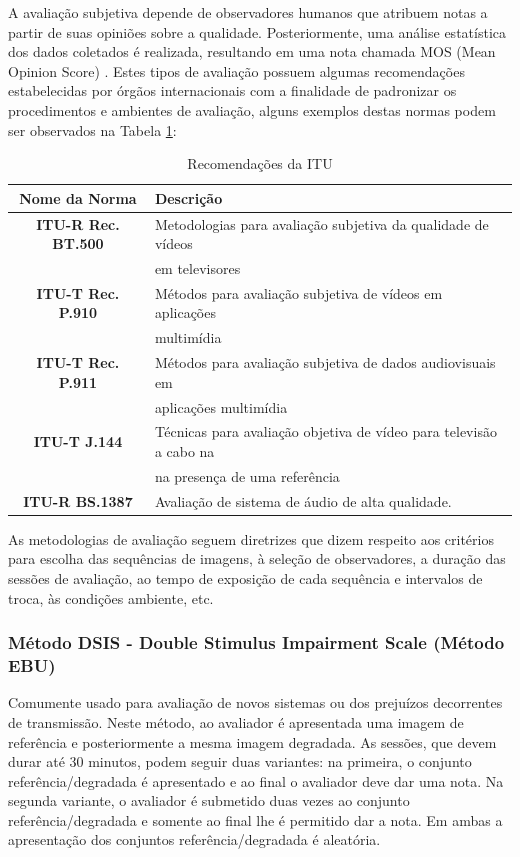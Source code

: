 A avaliação subjetiva depende de observadores humanos que atribuem notas a partir de suas opiniões sobre a qualidade. Posteriormente, uma análise estatística dos dados coletados é realizada, resultando em uma nota chamada MOS (Mean Opinion Score) \cite{itup930} \cite{albini}. Estes tipos de avaliação possuem algumas recomendações estabelecidas por órgãos internacionais com a finalidade de padronizar os procedimentos e ambientes de avaliação, alguns exemplos destas normas podem ser observados na Tabela \ref{tab:recomendacoes}:

\begin{table}
	\centering
	\caption{Recomendações da ITU}
	\label{tab:recomendacoes}
	\begin{tabular}{c|l}
		\hline
		\textbf{Nome da Norma} & Descrição \\
		\hline
		\textbf{ITU-R Rec. BT.500} & Metodologias para avaliação subjetiva da qualidade de vídeos \\
			& em televisores \\
		\textbf{ITU-T Rec. P.910} & Métodos para avaliação subjetiva de vídeos em aplicações \\
			& multimídia \\
		\textbf{ITU-T Rec. P.911} & Métodos para avaliação subjetiva de dados audiovisuais em \\
			& aplicações multimídia \\
		\textbf{ITU-T J.144} & Técnicas para avaliação objetiva de vídeo para televisão a cabo na \\
			& na presença de uma referência \\
		\textbf{ITU-R BS.1387} & Avaliação de sistema de áudio de alta qualidade. \\
		\hline
	\end{tabular}
\end{table}

As metodologias de avaliação seguem diretrizes que dizem respeito aos critérios para escolha das sequências de imagens, à seleção de observadores, a duração das sessões de avaliação, ao tempo de exposição de cada sequência e intervalos de troca, às condições ambiente, etc.

\subsubsection[Método DSIS]{Método DSIS - Double Stimulus Impairment Scale (Método EBU)}

Comumente usado para avaliação de novos sistemas ou dos prejuízos decorrentes de transmissão. Neste método, ao avaliador é apresentada uma imagem de referência e posteriormente a mesma imagem degradada. As sessões, que devem durar até 30 minutos, podem seguir duas variantes: na primeira, o conjunto referência/degradada é apresentado e ao final o avaliador deve dar uma nota. Na segunda variante, o avaliador é submetido duas vezes ao conjunto referência/degradada e somente ao final lhe é permitido dar a nota. Em ambas a apresentação dos conjuntos referência/degradada é aleatória.

